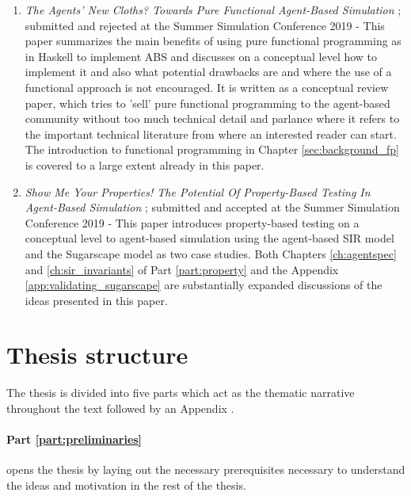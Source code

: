 \begin{enumerate}
	\item \textit{The Agents' New Cloths? Towards Pure Functional Agent-Based Simulation} \cite{thaler_agents_2019}; submitted and rejected at the Summer Simulation Conference 2019 - This paper summarizes the main benefits of using pure functional programming as in Haskell to implement ABS and discusses on a conceptual level how to implement it and also what potential drawbacks are and where the use of a functional approach is not encouraged. It is written as a conceptual review paper, which tries to 'sell' pure functional programming to the agent-based community without too much technical detail and parlance where it refers to the important technical literature from where an interested reader can start. The introduction to functional programming in Chapter \ref{sec:background_fp} is covered to a large extent already in this paper.
	
	\item \textit{Show Me Your Properties! The Potential Of Property-Based Testing In Agent-Based Simulation} \cite{thaler_show_2019}; submitted and accepted at the Summer Simulation Conference 2019 - This paper introduces property-based testing on a conceptual level to agent-based simulation using the agent-based SIR model and the Sugarscape model as two case studies. Both Chapters \ref{ch:agentspec} and \ref{ch:sir_invariants} of Part \ref{part:property} and the Appendix \ref{app:validating_sugarscape} are substantially expanded discussions of the ideas presented in this paper.
\end{enumerate}


\section{Thesis structure}

The thesis is divided into five parts which act as the thematic narrative throughout the text followed by an Appendix . 

\paragraph{Part \ref{part:preliminaries}} opens the thesis by laying out the necessary prerequisites necessary to understand the ideas and motivation in the rest of the thesis.
\medskip

